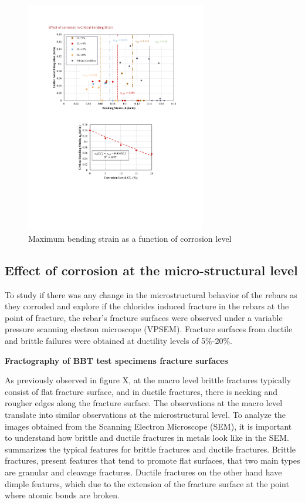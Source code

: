 \begin{figure}[htbp]
	\centering
	\includegraphics[width=0.7\textwidth]{VAC Thesis 2.0/Chapter-4/figs/BBT_results_summary.pdf}
	\caption{Maximum bending strain as a function of corrosion level}
	\label{fig:eb_vs_CL}
\end{figure}

\subsection{Effect of corrosion at the micro-structural level}

To study if there was any change in the microstructural behavior of the rebars as they corroded and explore if the chlorides induced fracture in the rebars at the point of fracture, the rebar's fracture surfaces were observed under a variable pressure scanning electron microscope (VPSEM). Fracture surfaces from ductile and brittle failures were obtained at ductility levels of 5\%-20\%.

\textbf{Fractography of BBT test specimens fracture surfaces}

 As previously observed in figure X, at the macro level brittle fractures typically consist of flat fracture surface, and in ductile fractures, there is necking and rougher edges along the fracture surface. The observations at the macro level translate into similar observations at the microstructural level. To analyze the images obtained from the Scanning Electron Microscope (SEM), it is important to understand how brittle and ductile fractures in metals look like in the SEM.  summarizes the typical features for brittle fractures and ductile fractures. Brittle fractures, present features that tend to promote flat surfaces, that two main types are granular and cleavage fractures. Ductile fractures on the other hand have dimple features, which due to the extension of the fracture surface at the point where atomic bonds are broken.
 
